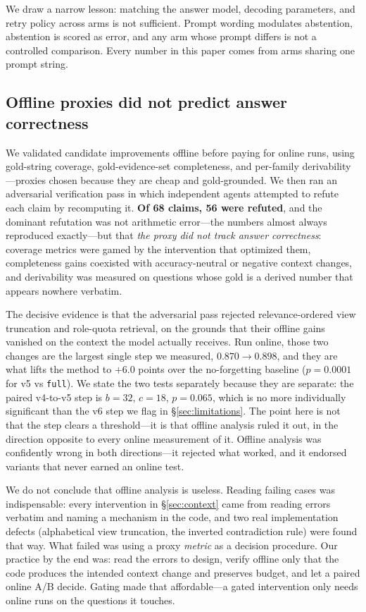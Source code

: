 \documentclass[11pt]{article}
\newcommand{\arm}[1]{\texttt{#1}}
\begin{document}
We draw a narrow lesson: matching the answer model, decoding parameters, and retry policy across arms is not sufficient. Prompt wording modulates abstention, abstention is scored as error, and any arm whose prompt differs is not a controlled comparison. Every number in this paper comes from arms sharing one prompt string.

\subsection{Offline proxies did not predict answer correctness}
\label{sec:proxies}

We validated candidate improvements offline before paying for online runs, using gold-string coverage, gold-evidence-set completeness, and per-family derivability---proxies chosen because they are cheap and gold-grounded. We then ran an adversarial verification pass in which independent agents attempted to refute each claim by recomputing it. \textbf{Of 68 claims, 56 were refuted}, and the dominant refutation was not arithmetic error---the numbers almost always reproduced exactly---but that \emph{the proxy did not track answer correctness}: coverage metrics were gamed by the intervention that optimized them, completeness gains coexisted with accuracy-neutral or negative context changes, and derivability was measured on questions whose gold is a derived number that appears nowhere verbatim.

The decisive evidence is that the adversarial pass rejected relevance-ordered view truncation and role-quota retrieval, on the grounds that their offline gains vanished on the context the model actually receives. Run online, those two changes are the largest single step we measured, $0.870 \rightarrow 0.898$, and they are what lifts the method to $+6.0$ points over the no-forgetting baseline ($p = 0.0001$ for v5 vs \arm{full}). We state the two tests separately because they are separate: the paired v4-to-v5 step is $b = 32$, $c = 18$, $p = 0.065$, which is no more individually significant than the v6 step we flag in \S\ref{sec:limitations}. The point here is not that the step clears a threshold---it is that offline analysis ruled it out, in the direction opposite to every online measurement of it. Offline analysis was confidently wrong in both directions---it rejected what worked, and it endorsed variants that never earned an online test.

We do not conclude that offline analysis is useless. Reading failing cases was indispensable: every intervention in \S\ref{sec:context} came from reading errors verbatim and naming a mechanism in the code, and two real implementation defects (alphabetical view truncation, the inverted contradiction rule) were found that way. What failed was using a proxy \emph{metric} as a decision procedure. Our practice by the end was: read the errors to design, verify offline only that the code produces the intended context change and preserves budget, and let a paired online A/B decide. Gating made that affordable---a gated intervention only needs online runs on the questions it touches.
\end{document}
